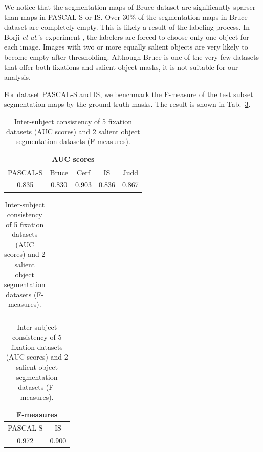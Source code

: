 We notice that the segmentation maps of Bruce dataset are significantly sparser than maps in PASCAL-S or IS. Over $30\%$ of the segmentation maps in Bruce dataset are completely empty.  This is likely a result of the labeling process.  In Borji \emph{et al.}'s experiment \cite{borji2013stands}, the labelers are forced to choose only one object for each image.  Images with two or more equally salient objects are very likely to become empty after thresholding.  Although Bruce is one of the very few datasets that offer both fixations and salient object masks, it is not suitable for our analysis.

For dataset PASCAL-S and IS, we benchmark the F-measure of the test subset segmentation maps by the ground-truth masks.  The result is shown in Tab.~\ref{tab:consistency}.

\begin{table}[h]\centering
\begin{tabular}{c|c|c|c|c}
\hline
\hline
\multicolumn{5}{c}{AUC scores}\\
\hline
PASCAL-S & Bruce & Cerf & IS & Judd \\
\hline
0.835 & 0.830 & 0.903 & 0.836 & 0.867\\
\hline
\hline
\end{tabular}

\begin{tabular}{c}
\\
\end{tabular}

\begin{tabular}{c|c}
\hline
\hline
\multicolumn{2}{c}{F-measures}\\
\hline
PASCAL-S & IS \\
\hline
0.972 & 0.900 \\
\hline
\hline
\end{tabular}
\caption{Inter-subject consistency of 5 fixation datasets (AUC scores) and 2 salient object segmentation datasets (F-measures).}\label{tab:consistency}
\end{table}



